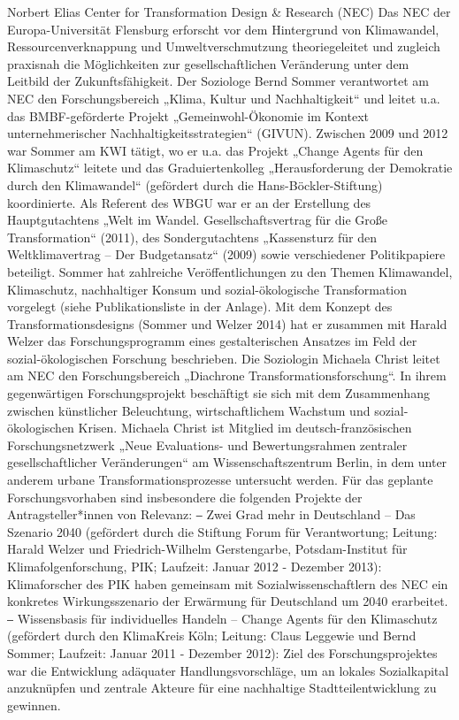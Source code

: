 Norbert Elias Center for Transformation Design & Research (NEC)
Das NEC der Europa-Universität Flensburg erforscht vor dem Hintergrund von Klimawandel, Ressourcenverknappung und Umweltverschmutzung theoriegeleitet und zugleich praxisnah die Möglichkeiten zur gesellschaftlichen Veränderung unter dem Leitbild der Zukunftsfähigkeit. Der Soziologe Bernd Sommer verantwortet am NEC den Forschungsbereich „Klima, Kultur und Nachhaltigkeit“ und leitet u.a. das BMBF-geförderte Projekt „Gemeinwohl-Ökonomie im Kontext unternehmerischer Nachhaltigkeitsstrategien“ (GIVUN). Zwischen 2009 und 2012 war Sommer am KWI tätigt, wo er u.a. das Projekt „Change Agents für den Klimaschutz“ leitete und das Graduiertenkolleg „Herausforderung der Demokratie durch den Klimawandel“ (gefördert durch die Hans-Böckler-Stiftung) koordinierte. Als Referent des WBGU war er an der Erstellung des Hauptgutachtens „Welt im Wandel. Gesellschaftsvertrag für die Große Transformation“ (2011), des Sondergutachtens „Kassensturz für den Weltklimavertrag – Der Budgetansatz“ (2009) sowie verschiedener Politikpapiere beteiligt. Sommer hat zahlreiche Veröffentlichungen zu den Themen Klimawandel, Klimaschutz, nachhaltiger Konsum und sozial-ökologische Transformation vorgelegt (siehe Publikationsliste in der Anlage). Mit dem Konzept des Transformationsdesigns (Sommer und Welzer 2014) hat er zusammen mit Harald Welzer das Forschungsprogramm eines gestalterischen Ansatzes im Feld der sozial-ökologischen Forschung beschrieben. Die Soziologin Michaela Christ leitet am NEC den Forschungsbereich „Diachrone Transformationsforschung“. In ihrem gegenwärtigen Forschungsprojekt beschäftigt sie sich mit dem Zusammenhang zwischen künstlicher Beleuchtung, wirtschaftlichem Wachstum und sozial-ökologischen Krisen. Michaela Christ ist Mitglied im deutsch-französischen Forschungsnetzwerk „Neue Evaluations- und Bewertungsrahmen zentraler gesellschaftlicher Veränderungen“ am Wissenschaftszentrum Berlin, in dem unter anderem urbane Transformationsprozesse untersucht werden. Für das geplante Forschungsvorhaben sind insbesondere die folgenden Projekte der Antragsteller*innen von Relevanz:
⎯	Zwei Grad mehr in Deutschland – Das Szenario 2040 (gefördert durch die Stiftung Forum für Verantwortung; Leitung: Harald Welzer und Friedrich-Wilhelm Gerstengarbe, Potsdam-Institut für Klimafolgenforschung, PIK; Laufzeit: Januar 2012 - Dezember 2013): Klimaforscher des PIK haben gemeinsam mit Sozialwissenschaftlern des NEC ein konkretes Wirkungsszenario der Erwärmung für Deutschland um 2040 erarbeitet.
⎯	Wissensbasis für individuelles Handeln – Change Agents für den Klimaschutz (gefördert durch den KlimaKreis Köln; Leitung: Claus Leggewie und Bernd Sommer; Laufzeit: Januar 2011 - Dezember 2012): Ziel des Forschungsprojektes war die Entwicklung adäquater Handlungsvorschläge, um an lokales Sozialkapital anzuknüpfen und zentrale Akteure für eine nachhaltige Stadtteilentwicklung zu gewinnen. 
